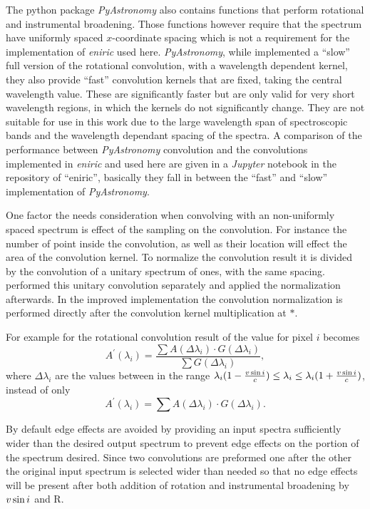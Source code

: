 The python package \emph{PyAstronomy} also contains functions that perform rotational and instrumental broadening.
Those functions however require that the spectrum have uniformly spaced $x$-coordinate spacing which is not a requirement for the implementation of \emph{eniric} used here. \emph{PyAstronomy}, while implemented a ``slow'' full version of the rotational convolution, with a wavelength dependent kernel, they also provide ``fast'' convolution kernels that are fixed, taking the central wavelength value.
These are significantly faster but are only valid for very short wavelength regions, in which the kernels do not significantly change.
They are not suitable for use in this work due to the large wavelength span of spectroscopic bands and the wavelength dependant spacing of the spectra.
A comparison of the performance between \emph{PyAstronomy} convolution and the convolutions implemented in \emph{eniric} and used here are given in a \emph{Jupyter} notebook in the repository of ``eniric'', basically they fall in between the ``fast'' and ``slow'' implementation of \emph{PyAstronomy}.

One factor the needs consideration when convolving with an non-uniformly spaced spectrum is effect of the sampling on the convolution.
For instance the number of point inside the convolution, as well as their location will effect the area of the convolution kernel.
To normalize the convolution result it is divided by the convolution of a unitary spectrum of ones, with the same spacing.
\citet{figueira_radial_2016} performed this unitary convolution separately and applied the normalization afterwards.
In the improved implementation the convolution normalization is performed directly after the convolution kernel multiplication at \(\textbf{*}\).

For example for the rotational convolution result of the value for pixel $i$ becomes
\[{A}^{\prime}(\lambda_{i}) =  \frac{\sum A(\Delta\lambda_{i}) \cdot G(\Delta\lambda_{i})}{\sum G(\Delta\lambda_{i})},\]
where $\Delta\lambda_{i}$ are the values between in the range $\lambda_{i} (1-\frac{v\sin{i}}{c}) \le\lambda_{i} \le \lambda_{i} (1+ \frac{v\sin{i}}{c})$,
instead of only
\[{A}^{\prime}(\lambda_{i}) =  \sum A(\Delta\lambda_{i}) \cdot G(\Delta\lambda_{i}).\]


By default edge effects are avoided by providing an input spectra sufficiently wider than the desired output spectrum to prevent edge effects on the portion of the spectrum desired.
Since two convolutions are preformed one after the other the original input spectrum is selected wider than needed so that no edge effects will be present after both  addition of  rotation and instrumental broadening by $v\sin{i}$ and R.

